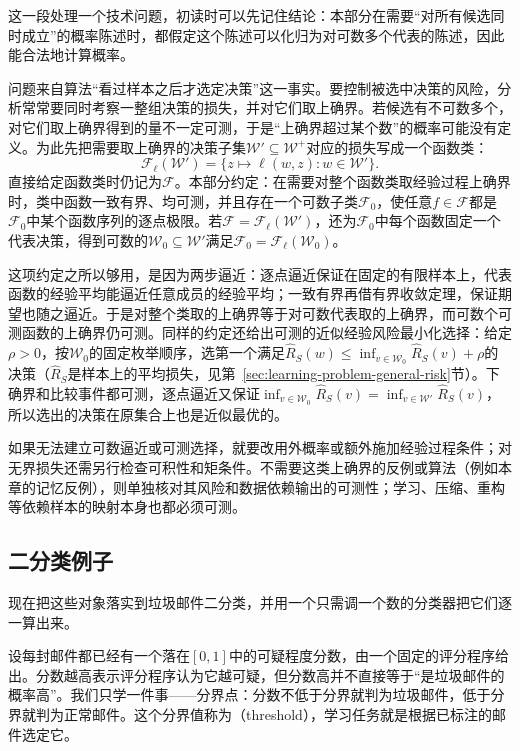 这一段处理一个技术问题，初读时可以先记住结论：本部分在需要“对所有候选同时成立”的概率陈述时，都假定这个陈述可以化归为对可数多个代表的陈述，因此能合法地计算概率。

问题来自算法“看过样本之后才选定决策”这一事实。要控制被选中决策的风险，分析常常要同时考察一整组决策的损失，并对它们取上确界。若候选有不可数多个，对它们取上确界得到的量不一定可测，于是“上确界超过某个数”的概率可能没有定义。为此先把需要取上确界的决策子集$\mathcal W'\subseteq\mathcal W^+$对应的损失写成一个函数类：
\[
 \mathcal F_\ell(\mathcal W')
 =\{z\mapsto\ell(w,z):w\in\mathcal W'\}.
\]
直接给定函数类时仍记为$\mathcal F$。本部分约定：在需要对整个函数类取经验过程上确界时，类中函数一致有界、均可测，并且存在一个可数子类$\mathcal F_0$，使任意$f\in\mathcal F$都是$\mathcal F_0$中某个函数序列的逐点极限。若$\mathcal F=\mathcal F_\ell(\mathcal W')$，还为$\mathcal F_0$中每个函数固定一个代表决策，得到可数的$\mathcal W_0\subseteq\mathcal W'$满足$\mathcal F_0=\mathcal F_\ell(\mathcal W_0)$。

这项约定之所以够用，是因为两步逼近：逐点逼近保证在固定的有限样本上，代表函数的经验平均能逼近任意成员的经验平均；一致有界再借有界收敛定理，保证期望也随之逼近。于是对整个类取的上确界等于对可数代表取的上确界，而可数个可测函数的上确界仍可测。同样的约定还给出可测的近似经验风险最小化选择：给定$\rho>0$，按$\mathcal W_0$的固定枚举顺序，选第一个满足$\hat R_S(w)\leq\inf_{v\in\mathcal W_0}\hat R_S(v)+\rho$的决策（$\hat R_S$是样本上的平均损失，见第~\ref{sec:learning-problem-general-risk}节）。下确界和比较事件都可测，逐点逼近又保证$\inf_{v\in\mathcal W_0}\hat R_S(v)=\inf_{v\in\mathcal W'}\hat R_S(v)$，所以选出的决策在原集合上也是近似最优的。

如果无法建立可数逼近或可测选择，就要改用外概率或额外施加经验过程条件；对无界损失还需另行检查可积性和矩条件。不需要这类上确界的反例或算法（例如本章的记忆反例），则单独核对其风险和数据依赖输出的可测性；学习、压缩、重构等依赖样本的映射本身也都必须可测。

\subsection{二分类例子}
\label{sec:learning-problem-binary-example}

现在把这些对象落实到垃圾邮件二分类，并用一个只需调一个数的分类器把它们逐一算出来。

设每封邮件都已经有一个落在$[0,1]$中的可疑程度分数，由一个固定的评分程序给出。分数越高表示评分程序认为它越可疑，但分数高并不直接等于“是垃圾邮件的概率高”。我们只学一件事——分界点：分数不低于分界就判为垃圾邮件，低于分界就判为正常邮件。这个分界值称为（threshold），学习任务就是根据已标注的邮件选定它。

